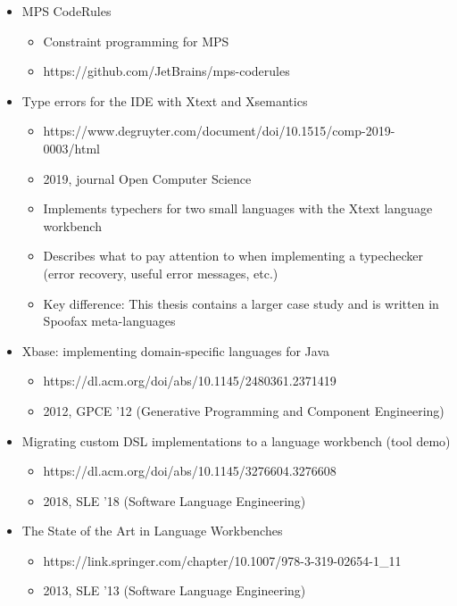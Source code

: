       \begin{itemize}
        \item MPS CodeRules
        \begin{itemize}
          \item Constraint programming for MPS
          \item https://github.com/JetBrains/mps-coderules
        \end{itemize}
        \item Type errors for the IDE with Xtext and Xsemantics
        \begin{itemize}
          \item https://www.degruyter.com/document/doi/10.1515/comp-2019-0003/html
          \item 2019, journal Open Computer Science
          \item Implements typechers for two small languages with the Xtext language workbench
          \item Describes what to pay attention to when implementing a typechecker (error recovery, useful error messages, etc.)
          \item Key difference: This thesis contains a larger case study and is written in Spoofax meta-languages
        \end{itemize}
        \item Xbase: implementing domain-specific languages for Java
        \begin{itemize}
          \item https://dl.acm.org/doi/abs/10.1145/2480361.2371419
          \item 2012, GPCE '12 (Generative Programming and Component Engineering)
        \end{itemize}
        \item Migrating custom DSL implementations to a language workbench (tool demo)
        \begin{itemize}
          \item https://dl.acm.org/doi/abs/10.1145/3276604.3276608
          \item 2018, SLE '18 (Software Language Engineering)
        \end{itemize}
        \item The State of the Art in Language Workbenches
        \begin{itemize}
          \item https://link.springer.com/chapter/10.1007/978-3-319-02654-1\_11
          \item 2013, SLE '13 (Software Language Engineering)

\end{itemize}
\end{itemize}

